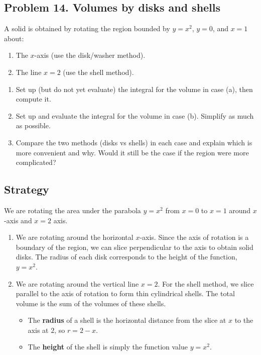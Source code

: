 \subsection{Problem 14. Volumes by disks and shells}
A solid is obtained by rotating the region bounded by $y=x^{2}$, $y=0$, and $x=1$ about:
\begin{enumerate}[label=(\alph*)]
    \item The $x$-axis (use the disk/washer method).
    \item The line $x=2$ (use the shell method).
\end{enumerate}

\begin{enumerate}[label=(\alph*), start=3]
    \item Set up (but do not yet evaluate) the integral for the volume in case (a), then compute it.
    \item Set up and evaluate the integral for the volume in case (b). Simplify as much as possible.
    \item Compare the two methods (disks vs shells) in each case and explain which is more convenient and why. Would it still be the case if the region were more complicated?
\end{enumerate}

\subsection*{Strategy}
We are rotating the area under the parabola $y=x^2$ from $x=0$ to $x=1$ around $x$-axis and $x=2$ axis.
\begin{enumerate}[label = (\alph*)]
    \item We are rotating around the horizontal $x$-axis. Since the axis of rotation is a boundary of the region, we can slice perpendicular to the axis to obtain solid disks. The radius of each disk corresponds to the height of the function, $y=x^2$.
    
    \item We are rotating around the vertical line $x=2$. For the shell method, we slice parallel to the axis of rotation to form thin cylindrical shells. The total volume is the sum of the volumes of these shells.
    \begin{itemize}
        \item The \textbf{radius} of a shell is the horizontal distance from the slice at $x$ to the axis at $2$, so $r = 2-x$.
        \item The \textbf{height} of the shell is simply the function value $y=x^2$.
    \end{itemize}
\end{enumerate}
\pagebreak

